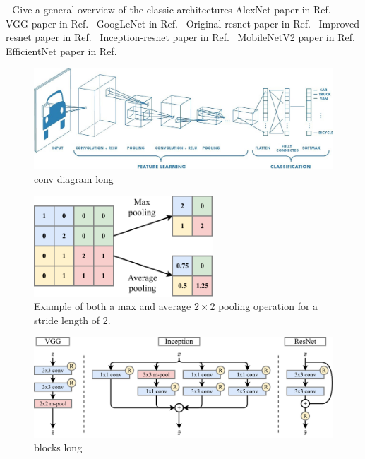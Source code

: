 - Give a general overview of the classic architectures
AlexNet paper in Ref.~\cite{krizhevsky2012}
VGG paper in Ref.~\cite{simonyan2014}
GoogLeNet in Ref.~\cite{szegedy2015}
Original resnet paper in Ref.~\cite{he2016_original}
Improved resnet paper in Ref.~\cite{he2016_improved}
Inception-resnet paper in Ref.~\cite{szegedy2016}
MobileNetV2 paper in Ref.~\cite{sandler2018}
EfficientNet paper in Ref.~\cite{tan2019}

\begin{figure} %
    \includegraphics[width=\textwidth]{diagrams/7-cvn/conv_diagram.jpeg}
    \caption[conv diagram short]
    {conv diagram long}
    \label{fig:conv_diagram}
\end{figure}





\begin{figure} %
    \includegraphics[width=0.6\textwidth]{diagrams/7-cvn/pooling.pdf}
    \caption[Example of pooling operation.]
    {Example of both a max and average $2 \times 2$ pooling operation for a stride length of 2.}
    \label{fig:pooling}
\end{figure}

\begin{figure} %
    \includegraphics[width=\textwidth]{diagrams/7-cvn/blocks.pdf}
    \caption[blocks short]
    {blocks long}
    \label{fig:blocks}
\end{figure}


